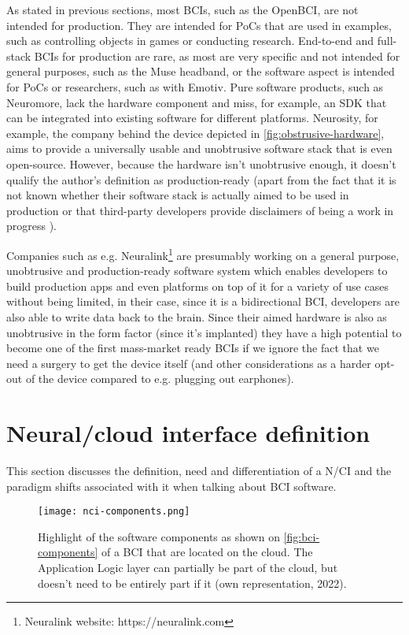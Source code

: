 As stated in previous sections, most BCIs, such as the OpenBCI, are not intended for production. They are intended for PoCs that are used in examples, such as controlling objects in games or conducting research. End-to-end and full-stack BCIs for production are rare, as most are very specific and not intended for general purposes, such as the Muse headband, or the software aspect is intended for PoCs or researchers, such as with Emotiv. Pure software products, such as Neuromore, lack the hardware component and miss, for example, an SDK that can be integrated into existing software for different platforms. Neurosity, for example, the company behind the device depicted in \autoref{fig:obstrusive-hardware}, aims to provide a universally usable and unobtrusive software stack that is even open-source. However, because the hardware isn't unobtrusive enough, it doesn't qualify the author's definition as production-ready (apart from the fact that it is not known whether their software stack is actually aimed to be used in production \citep{neurosity_neurosity_2022} or that third-party developers provide disclaimers of being a work in progress \citep{turney_notion_2022}).

\newpage

Companies such as e.g. Neuralink\footnote{Neuralink website: https://neuralink.com} are presumably working on a general purpose, unobtrusive and production-ready software system which enables developers to build production apps and even platforms on top of it for a variety of use cases without being limited, in their case, since it is a bidirectional BCI, developers are also able to write data back to the brain. Since their aimed hardware is also as unobtrusive in the form factor (since it's implanted) they have a high potential to become one of the first mass-market ready BCIs if we ignore the fact that we need a surgery to get the device itself (and other considerations as a harder opt-out of the device compared to e.g. plugging out earphones).

\section{Neural/cloud interface definition}
\label{chapter2-neural-cloud-interface-definition}

This section discusses the definition, need and differentiation of a N/CI and the paradigm shifts associated with it when talking about BCI software.

\begin{figure}[!ht]
  \centering
  \texttt{[image: nci-components.png]}
  \caption{Highlight of the software components as shown on \autoref{fig:bci-components} of a BCI that are located on the cloud. The Application Logic layer can partially be part of the cloud, but doesn't need to be entirely part if it (own representation, 2022).}
  \label{fig:nci-components}
\end{figure}

